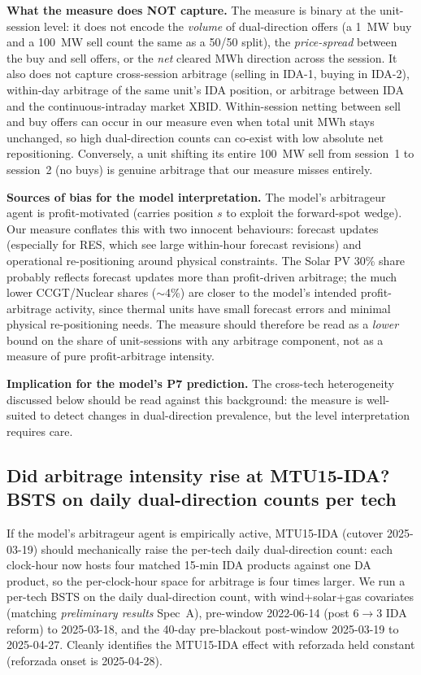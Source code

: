 \documentclass[11pt,a4paper]{article}
\begin{document}
\textbf{What the measure does NOT capture.} The measure is binary at the unit-session level: it does not encode the \emph{volume} of dual-direction offers (a 1~MW buy and a 100~MW sell count the same as a 50/50 split), the \emph{price-spread} between the buy and sell offers, or the \emph{net} cleared MWh direction across the session. It also does not capture cross-session arbitrage (selling in IDA-1, buying in IDA-2), within-day arbitrage of the same unit's IDA position, or arbitrage between IDA and the continuous-intraday market XBID. Within-session netting between sell and buy offers can occur in our measure even when total unit MWh stays unchanged, so high dual-direction counts can co-exist with low absolute net repositioning. Conversely, a unit shifting its entire 100~MW sell from session~1 to session~2 (no buys) is genuine arbitrage that our measure misses entirely.

\textbf{Sources of bias for the model interpretation.} The model's arbitrageur agent is profit-motivated (carries position $s$ to exploit the forward-spot wedge). Our measure conflates this with two innocent behaviours: forecast updates (especially for RES, which see large within-hour forecast revisions) and operational re-positioning around physical constraints. The Solar PV 30\% share probably reflects forecast updates more than profit-driven arbitrage; the much lower CCGT/Nuclear shares ($\sim$4\%) are closer to the model's intended profit-arbitrage activity, since thermal units have small forecast errors and minimal physical re-positioning needs. The measure should therefore be read as a \emph{lower} bound on the share of unit-sessions with any arbitrage component, not as a measure of pure profit-arbitrage intensity.

\textbf{Implication for the model's P7 prediction.} The cross-tech heterogeneity discussed below should be read against this background: the measure is well-suited to detect changes in dual-direction prevalence, but the level interpretation requires care.

\subsection{Did arbitrage intensity rise at MTU15-IDA? BSTS on daily dual-direction counts per tech}\label{sec:prov:arbitrage_bsts}

If the model's arbitrageur agent is empirically active, MTU15-IDA (cutover 2025-03-19) should mechanically raise the per-tech daily dual-direction count: each clock-hour now hosts four matched 15-min IDA products against one DA product, so the per-clock-hour space for arbitrage is four times larger. We run a per-tech BSTS on the daily dual-direction count, with wind+solar+gas covariates (matching \emph{preliminary results} Spec~A), pre-window 2022-06-14 (post 6$\to$3 IDA reform) to 2025-03-18, and the 40-day pre-blackout post-window 2025-03-19 to 2025-04-27. Cleanly identifies the MTU15-IDA effect with reforzada held constant (reforzada onset is 2025-04-28).
\end{document}
